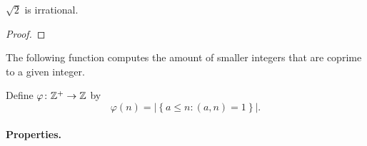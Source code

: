 \documentclass[11pt,a5paper]{article}
\begin{document}
\begin{prop}
    \(\sqrt{2}\) is irrational.
\end{prop}

\begin{proof}
    
\end{proof}


\begin{teo}
    
\end{teo}

The following function  computes the amount of smaller integers that are coprime to a given integer.
\begin{defi}
    Define \(\varphi \colon \mathbb{Z}^+\to \mathbb{Z}\) by 
    \[\varphi(n) = |\left\{ a\leq n : (a,n) = 1 \right\}|.\]
\end{defi}

\paragraph{Properties.} 
\end{document}

